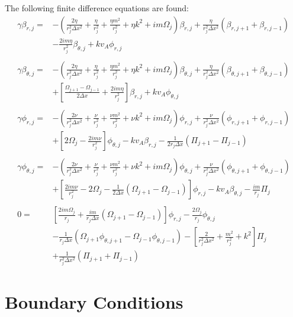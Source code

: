 \documentclass[letterpaper]{article}
\begin{document}
The following finite difference equations are found:
\begin{align}
\gamma\beta_{r, j} = &-(\frac{2\eta}{r_j^2 \Delta x^2} + \frac{\eta}{r_j^2} + \frac{\eta m^2}{r_j^2} + \eta k^2 + im\Omega_j )\beta_{r, j} +\frac{\eta}{r_j^2 \Delta x^2}(\beta_{r, j+1} + \beta_{r, j-1})
\nonumber \\
&- \frac{2im \eta}{r_j^2}\beta_{\theta,j} + k v_A \phi_{r,j}
\\
\nonumber \\
\gamma\beta_{\theta,j}=&-(\frac{2\eta}{r_j^2 \Delta x^2} + \frac{\eta}{r_j^2} + \frac{\eta m^2}{r_j^2} + \eta k^2 + im\Omega_j)\beta_{\theta, j} +\frac{\eta}{r_j^2 \Delta x^2}(\beta_{\theta, j+1} + \beta_{\theta, j-1})
\nonumber \\
&+\left[\frac{\Omega_{j+1}-\Omega_{j-1}}{2\Delta x} + \frac{2im\eta}{r_j^2}\right]\beta_{r,j} + kv_A\phi_{\theta,j}
\\
\nonumber \\
\gamma\phi_{r, j} = &-(\frac{2\nu}{r_j^2 \Delta x^2} + \frac{\nu}{r_j^2} + \frac{\nu m^2}{r_j^2} + \nu k^2 + im\Omega_j)\phi_{r, j} + \frac{\nu}{r_j^2 \Delta x^2}(\phi_{r, j+1} + \phi_{r, j-1})
\nonumber \\
&+ \left[2\Omega_{j}-\frac{2im\nu}{r_j^2} \right]\phi_{\theta, j} - kv_A\beta_{r,j} - \frac{1}{2 r_j \Delta x}\left(\Pi_{j+1}-\Pi_{j-1}\right)
\\
\nonumber \\
\gamma\phi_{\theta, j} = &-(\frac{2\nu}{r_j^2 \Delta x^2} + \frac{\nu}{r_j^2} + \frac{\nu m^2}{r_j^2} + \nu k^2 + im\Omega_j)\phi_{\theta, j} + \frac{\nu}{r_j^2 \Delta x^2}(\phi_{\theta, j+1} + \phi_{\theta, j-1})
\nonumber \\
&+ \left[\frac{2im\nu}{r_j^2} - 2\Omega_j - \frac{1}{2\Delta x}\left(\Omega_{j+1}-\Omega_{j-1}\right)\right]\phi_{r,j} - kv_A \beta_{\theta, j} - \frac{im}{r_j}\Pi_{j}
\\
\nonumber \\
0 = &\left[\frac{2im\Omega_j}{r_j} + \frac{im}{r_j \Delta x}(\Omega_{j+1}-\Omega_{j-1})\right]\phi_{r,j} - \frac{2\Omega_j}{r_j}\phi_{\theta,j} 
\nonumber \\
&- \frac{1}{r_j \Delta x}\left(\Omega_{j+1}\phi_{\theta,j+1}-\Omega_{j-1}\phi_{\theta,j-1}\right) - \left[\frac{2}{r_j^2\Delta x^2} + \frac{m^2}{r_j^2}+k^2\right]\Pi_{j}
\nonumber \\
&+\frac{1}{r_j^2 \Delta x^2}\left(\Pi_{j+1} + \Pi_{j-1}\right)
\end{align}

\section{Boundary Conditions}
\end{document}
